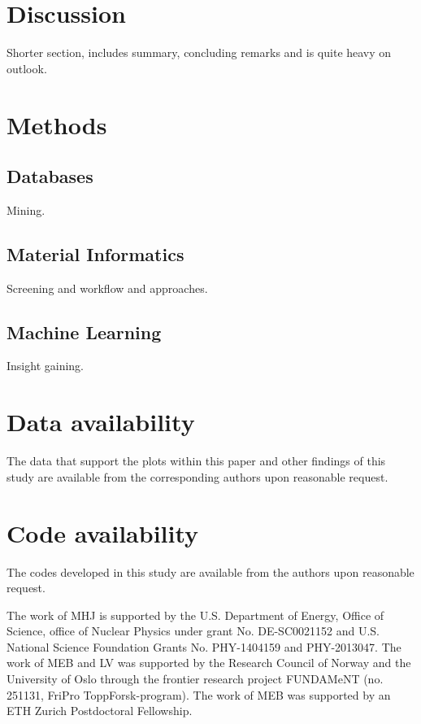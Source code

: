 \documentclass[superscriptaddress,unsortedaddress,
 amsmath,amssymb,
 aps,
]{revtex4-2}
\begin{document}
\section*{Discussion} %
Shorter section, includes summary, concluding remarks and is quite heavy on outlook.  

\section*{Methods}

\subsection*{Databases} %
Mining.  

\subsection*{Material Informatics} %
Screening and workflow and approaches.  

\subsection*{Machine Learning} %
Insight gaining. 

\section*{Data availability} 
The data that support the plots within this paper and other findings of this study are
available from the corresponding authors upon reasonable request.

\section*{Code availability} 
The codes developed in this study are available from the authors upon reasonable
request.


\begin{acknowledgments}

The work of MHJ is supported by the U.S. Department of Energy,
Office of Science, office of Nuclear Physics under grant
No. DE-SC0021152 and U.S. National Science Foundation Grants
No. PHY-1404159 and PHY-2013047. 
The work of MEB and LV was supported by the Research Council of Norway and the University of Oslo through the frontier research project FUNDAMeNT (no. 251131, FriPro ToppForsk-program). 
The work of MEB was supported by an ETH Zurich Postdoctoral Fellowship. 

\end{acknowledgments}
\end{document}

